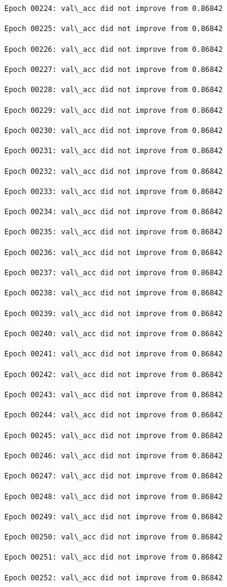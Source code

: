 \documentclass[11pt]{article}
\begin{document}
\begin{Verbatim}[commandchars=\\\{\}]
Epoch 00224: val\_acc did not improve from 0.86842

Epoch 00225: val\_acc did not improve from 0.86842

Epoch 00226: val\_acc did not improve from 0.86842

Epoch 00227: val\_acc did not improve from 0.86842

Epoch 00228: val\_acc did not improve from 0.86842

Epoch 00229: val\_acc did not improve from 0.86842

Epoch 00230: val\_acc did not improve from 0.86842

Epoch 00231: val\_acc did not improve from 0.86842

Epoch 00232: val\_acc did not improve from 0.86842

Epoch 00233: val\_acc did not improve from 0.86842

Epoch 00234: val\_acc did not improve from 0.86842

Epoch 00235: val\_acc did not improve from 0.86842

Epoch 00236: val\_acc did not improve from 0.86842

Epoch 00237: val\_acc did not improve from 0.86842

Epoch 00238: val\_acc did not improve from 0.86842

Epoch 00239: val\_acc did not improve from 0.86842

Epoch 00240: val\_acc did not improve from 0.86842

Epoch 00241: val\_acc did not improve from 0.86842

Epoch 00242: val\_acc did not improve from 0.86842

Epoch 00243: val\_acc did not improve from 0.86842

Epoch 00244: val\_acc did not improve from 0.86842

Epoch 00245: val\_acc did not improve from 0.86842

Epoch 00246: val\_acc did not improve from 0.86842

Epoch 00247: val\_acc did not improve from 0.86842

Epoch 00248: val\_acc did not improve from 0.86842

Epoch 00249: val\_acc did not improve from 0.86842

Epoch 00250: val\_acc did not improve from 0.86842

Epoch 00251: val\_acc did not improve from 0.86842

Epoch 00252: val\_acc did not improve from 0.86842


\end{Verbatim}
\end{document}
